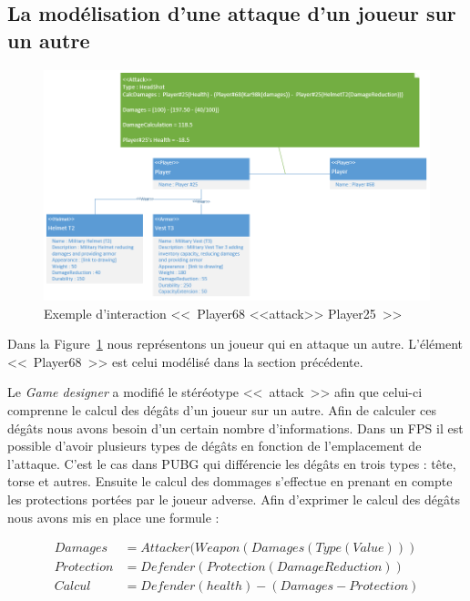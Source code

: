 \subsection{La modélisation d'une attaque d'un joueur sur un autre}
\begin{figure}[H]
    \centering
    \includegraphics[width=14cm]{10_img/chap6/attack.PNG} 
    \caption{Exemple d'interaction <<~Player68 <<attack>> Player25~>>}
    \label{fig.attack}
\end{figure}

Dans la Figure~\ref{fig.attack} nous représentons un joueur qui en attaque un autre.
L'élément <<~Player68~>> est celui modélisé dans la section précédente.

Le \emph{Game designer} a modifié le stéréotype <<~attack~>> afin que celui-ci comprenne le calcul des dégâts d'un joueur sur un autre.
Afin de calculer ces dégâts nous avons besoin d'un certain nombre d'informations.
Dans un FPS il est possible d'avoir plusieurs types de dégâts en fonction de l'emplacement de l'attaque.
C'est le cas dans PUBG qui différencie les dégâts en trois types : tête, torse et autres.
Ensuite le calcul des dommages s'effectue en prenant en compte les protections portées par le joueur adverse.
Afin d'exprimer le calcul des dégâts nous avons mis en place une formule :

\begin{equation}
\begin{split}
Damages& = Attacker(Weapon(Damages(Type(Value)))\\
Protection& = Defender(Protection(DamageReduction))\\
Calcul& = Defender(health) - (Damages - Protection)
\end{split}
\label{calc.damages}
\end{equation}

